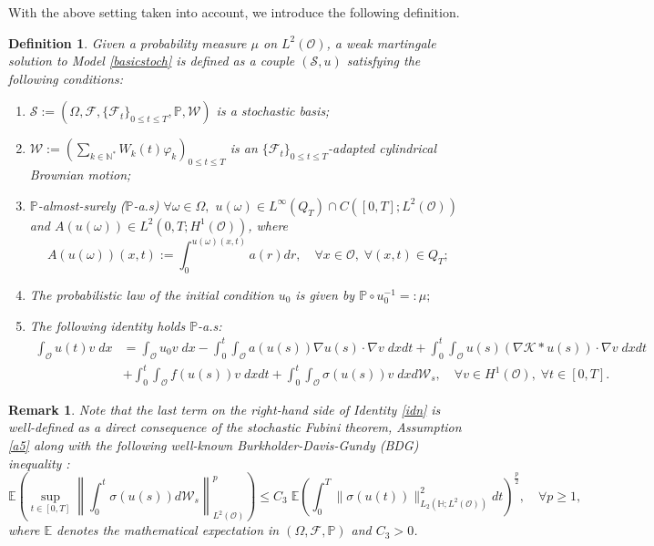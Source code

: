 \documentclass[10pt,number,preprint,times]{elsarticle}
\numberwithin{equation}{section} %
\newtheorem{defi}{Definition}[section]
\newtheorem{rem}{Remark}[section]
\begin{document}
With the above setting taken into account, we introduce  the  following definition.
\begin{defi}\label{dfwk}
Given a probability measure $\mu$ on $L^2(\mathcal{O})$, a weak martingale solution to Model \eqref{basicstoch} is defined as a couple $\left(\mathscr{S},u\right)$ satisfying the following conditions:
\begin{enumerate}
	\item $\mathscr{S}:=\left(\Omega,\mathcal{F},\{\mathcal{F}_t\}_{0 \leq t \leq T},\mathbb{P},\mathcal{W}\right)$ is a stochastic basis;
	\item $\mathcal{W}:=\left(\displaystyle \sum_{k \in \mathbb{N}^*}  W_k(t) \varphi_k\right)_{0 \leq t \leq T}$ is an $\{\mathcal{F}_t\}_{0 \leq t \leq T}$-adapted cylindrical Brownian motion;
	\item $\mathbb{P}$-almost-surely ($\mathbb{P}$-a.s) $\forall \omega \in \Omega,$ $u(\omega) \in L^\infty(Q_T) \cap C([0,T];L^2(\mathcal{O}))$ and ${A}(u(\omega)) \in L^2(0,T;H^1(\mathcal{O}))$, where  
	$$
	{A}(u(\omega))(x,t):=\displaystyle \int_{0}^{u(\omega)(x,t)} a(r) dr, \quad \forall x \in \mathcal{O},\; \forall (x,t) \in Q_T;
	$$
	\item The probabilistic law of the initial condition $u_0$ is given by 
	$
    \mathbb{P} \circ u_0^{-1}=:\mu;
	$
	\item The following identity holds $\mathbb{P}$-a.s:
\begin{equation}\label{idn}
	\begin{split}
	\int_\mathcal{O} u(t)v\; dx&= \int_\mathcal{O} u_0v\; dx- \int_{0}^t \int_{\mathcal{O}} a(u(s))\nabla u(s) \cdot \nabla v\; dxdt+\int_{0}^t \int_{\mathcal{O}} u(s)\left(\nabla \mathcal{K} \ast u(s)\right) \cdot \nabla v\; dxdt\\
	&+\int_{0}^t \int_{\mathcal{O}} f(u(s))v\; dxdt+\int_{0}^t \int_{\mathcal{O}} \sigma(u(s))v\; dx d\mathcal{W}_s, \quad \forall v \in H^1(\mathcal{O}), \; \forall t \in [0,T].
	\end{split}
\end{equation}
\end{enumerate}
\end{defi}
\begin{rem}\label{rmbdg}
Note that the last term on the right-hand side of Identity \eqref{idn} is well-defined as a direct consequence of the stochastic Fubini theorem, Assumption \ref{a5} along with the following well-known Burkholder-Davis-Gundy (BDG) inequality \cite{revuz2013continuous}:
$$
\mathbb{E}\left(\sup _{t \in[0, T]}\left\|\int_0^t \sigma(u(s)) d \mathcal{W}_s\right\|_{L^2(\mathcal{O})}^p\right) \leq C_3\; \mathbb{E}\left(\int_0^T\| \sigma(u(t))\|_{{L}_2(\mathbb{H} ;L^2(\mathcal{O}))}^2 dt\right)^{\frac{p}{2}}, \quad \forall p \geq 1,
$$
where $\mathbb{E}$ denotes the mathematical expectation in $(\Omega,\mathcal{F},\mathbb{P})$ and $C_3>0$.
\end{rem}
\end{document}
